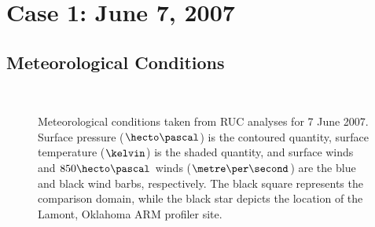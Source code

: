 \section{Case 1: June 7, 2007}
\label{june7-43}

\subsection{Meteorological Conditions}
\label{mc-431}


\begin{figure}[H]
     \begin{center}
%
        \\ %
%
    \end{center}
    \caption{%
        Meteorological conditions taken from RUC analyses for 7 June 2007. Surface pressure ($\hecto\pascal$) is the contoured quantity, surface temperature ($\kelvin$) is the shaded quantity, and surface winds and $850\hecto\pascal$ winds ($\metre\per\second$) are the blue and black wind barbs, respectively. The black square represents the comparison domain, while the black star depicts the location of the Lamont, Oklahoma ARM profiler site.}%
   \label{figure402}
\end{figure}


